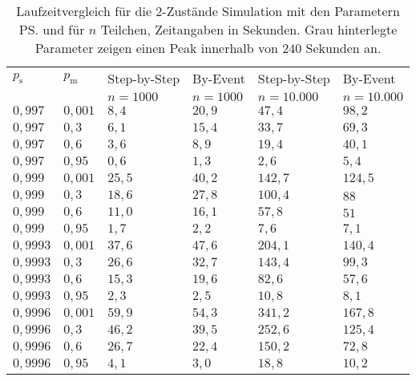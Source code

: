 \begin{table}[h]
\centering
\caption[Laufzeitvergleich für die 2-Zustände Simulation]{Laufzeitvergleich für die 2-Zustände Simulation mit den Parametern \ps und \pm für $n$ Teilchen, Zeitangaben in Sekunden. Grau hinterlegte Parameter zeigen einen Peak innerhalb von $240$ Sekunden an.}
\label{2s_laufzeit}
\begin{tabular}{|l|l||l|l|l|l|} \hline
$p_\text{s}$ & $p_\text{m}$  & Step-by-Step & By-Event & Step-by-Step & By-Event \\ 
 &   & $n=1000$ &$n=1000$ &$n=10.000$ &$n=10.000$  \\ \hline \hline
$0,997  $ & $ 0,001 $ & $ 8,4  $ & $ 20,9  $ & $ 47,4  $ & $98,2  $\\ \hline
$0,997  $ & $ 0,3  $ & $ 6,1  $ & $ 15,4  $ & $ 33,7  $ & $69,3  $\\ \hline
$0,997  $ & $ 0,6  $ & $ 3,6  $ & $ 8,9   $  & $ 19,4 $ & $40,1  $\\ \hline
$0,997  $ & $ 0,95 $ & $ 0,6  $ & $ 1,3   $  & $ 2,6  $ & $5,4   $\\ \hline
$0,999  $ & $ 0,001 $ & $ 25,5 $ & $ 40,2  $ & $ 142,7 $ & $124,5 $\\ \hline
$0,999  $ & $ 0,3  $ & $ 18,6 $ & $ 27,8  $ & $ 100,4 $ & $88    $\\ \hline
$0,999  $ & $ 0,6  $ & $ 11,0 $ & $ 16,1  $ & $ 57,8  $ & $51    $\\ \hline
$0,999  $ & $ 0,95 $ & $ 1,7  $ & $ 2,2   $ & $ 7,6   $ & $7,1   $\\ \hline
$0,9993 $ & $ 0,001 $ & $ 37,6 $ & $ 47,6  $ & $ 204,1 $ & $140,4 $\\ \hline
$0,9993 $ & $ 0,3  $ & $ 26,6 $ & $ 32,7  $ & $ 143,4 $ & $99,3  $\\ \hline
$0,9993 $ & $ 0,6  $ & $ 15,3 $ & $ 19,6  $ & $ 82,6  $ & $57,6  $\\ \hline
$0,9993 $ & $ 0,95 $ & $ 2,3  $ & $ 2,5   $ & $ 10,8  $ & $8,1   $\\ \hline
\cellcolor{gray!40}$0,9996 $ &\cellcolor{gray!40}$ 0,001 $ & $ 59,9$ & $ 54,3 $ & $341,2 $ & $167,8$\\ \hline
$0,9996 $ & $ 0,3  $ & $ 46,2 $ & $ 39,5  $ & $ 252,6 $ & $125,4 $\\ \hline
$0,9996 $ & $ 0,6  $ & $ 26,7 $ & $ 22,4  $ & $ 150,2 $ & $72,8  $\\ \hline
$0,9996 $ & $ 0,95 $ & $ 4,1  $ & $ 3,0   $ & $ 18,8  $ & $10,2  $\\ \hline
\end{tabular}
\end{table}

